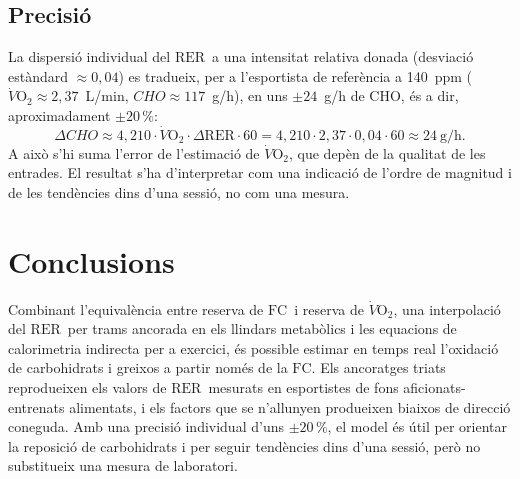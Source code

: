 \documentclass[10pt,a4paper]{article}
\newcommand{\VO}{\ensuremath{\dot V\mathrm{O_2}}}
\newcommand{\RER}{\ensuremath{\mathrm{RER}}}
\newcommand{\FC}{\ensuremath{\mathrm{FC}}}
\begin{document}
\subsection{Precisió}
La dispersió individual del \RER\ a una intensitat relativa donada (desviació
estàndard $\approx0{,}04$) \citep{goedecke2000} es tradueix, per a l'esportista
de referència a 140~ppm ($\VO\approx2{,}37$~L/min, $CHO\approx117$~g/h), en uns
$\pm24$~g/h de CHO, és a dir, aproximadament $\pm20\,\%$:
\begin{equation}
  \Delta CHO\approx4{,}210\cdot\VO\cdot\Delta\RER\cdot60
  =4{,}210\cdot2{,}37\cdot0{,}04\cdot60\approx24~\mathrm{g/h}.
\end{equation}
A això s'hi suma l'error de l'estimació de \VO, que depèn de la qualitat de les
entrades. El resultat s'ha d'interpretar com una indicació de l'ordre de magnitud i
de les tendències dins d'una sessió, no com una mesura.

\section{Conclusions}

Combinant l'equivalència entre reserva de \FC\ i reserva de \VO, una interpolació
del \RER\ per trams ancorada en els llindars metabòlics i les equacions de
calorimetria indirecta per a exercici, és possible estimar en temps real l'oxidació
de carbohidrats i greixos a partir només de la \FC. Els ancoratges triats
reprodueixen els valors de \RER\ mesurats en esportistes de fons aficionats-entrenats
alimentats, i els factors que se n'allunyen produeixen biaixos de direcció coneguda.
Amb una precisió individual d'uns $\pm20\,\%$, el model és útil per orientar la
reposició de carbohidrats i per seguir tendències dins d'una sessió, però no
substitueix una mesura de laboratori.
\end{document}
